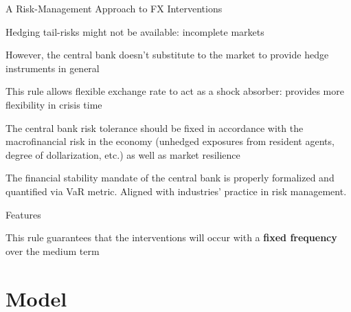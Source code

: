 \documentclass{beamer}
\newenvironment{largeitemize}{\itemize\addtolength{\itemsep}{10pt}}{\enditemize}
\newenvironment{largeenumerate}{\enumerate\addtolength{\itemsep}{10pt}}{\endenumerate}
\begin{document}
\begin{frame}{A Risk-Management Approach to FX Interventions}
  \begin{largeitemize}
    \item Hedging tail-risks might not be available:
      incomplete markets
    \item However, the central bank doesn't substitute to the market to
      provide hedge instruments in general
    \item This rule allows flexible exchange rate to act as a shock absorber:
      provides more flexibility in crisis time
    \item The central bank risk tolerance should be fixed in accordance with the
      macrofinancial risk in the economy (unhedged exposures from resident agents, degree of
      dollarization, etc.) as well as market resilience
    \item The financial stability mandate of the central bank is properly
      formalized and quantified via VaR metric. Aligned with industries' practice in risk management.
  \end{largeitemize}
  
\end{frame}


\begin{frame}{Features}
  \begin{largeenumerate}
    \item 
    
    \item This rule guarantees that the interventions will occur with a \textbf{fixed
        frequency} over the medium term
    \item 
  \end{largeenumerate}
  
\end{frame}





\section{Model}
\end{document}
